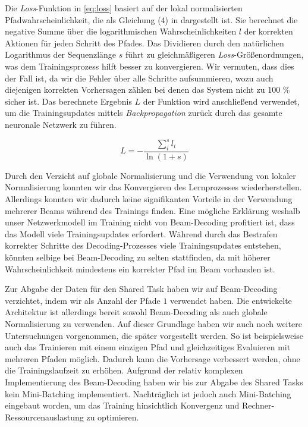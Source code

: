 \documentclass[11pt,a4paper]{article}
\begin{document}
Die \textit{Loss}-Funktion in \autoref{eq:loss} basiert auf der lokal normalisierten Pfadwahrscheinlichkeit, die als Gleichung (4) in \citet{globalnorm:AndorAWSPGPC16} dargestellt ist.
Sie berechnet die negative Summe über die logarithmischen Wahrscheinlichkeiten $l$ der korrekten Aktionen für jeden Schritt des Pfades.
Das Dividieren durch den natürlichen Logarithmus der Sequenzlänge $s$ führt zu gleichmäßigeren \textit{Loss}-Größenordnungen, was dem Trainingsprozess hilft besser zu konvergieren.
Wir vermuten, dass dies der Fall ist, da wir die Fehler über alle Schritte aufsummieren, wozu auch diejenigen korrekten Vorhersagen zählen bei denen das System nicht zu 100 \% sicher ist.
Das berechnete Ergebnis $L$ der Funktion wird anschließend verwendet, um die Trainingsupdates mittels \textit{Backpropagation} zurück durch das gesamte neuronale Netzwerk zu führen.

\begin{equation}
\label{eq:loss}
L = - \frac{\sum_i^s l_i}{\ln{(1+s)}}
\end{equation}

Durch den Verzicht auf globale Normalisierung und die Verwendung von lokaler Normalisierung konnten wir das Konvergieren des Lernprozesses wiederherstellen. Allerdings konnten wir dadurch keine signifikanten Vorteile in der Verwendung mehrerer Beams während des Trainings finden.
Eine mögliche Erklärung weshalb unser Netzwerkmodell im Training nicht von Beam-Decoding profitiert ist, dass das Modell viele Trainingsupdates erfordert.
Während durch das Bestrafen korrekter Schritte des Decoding-Prozesses viele Trainingsupdates entstehen, könnten selbige bei Beam-Decoding zu selten stattfinden, da mit höherer Wahrscheinlichkeit mindestens ein korrekter Pfad im Beam vorhanden ist.

Zur Abgabe der Daten für den Shared Task haben wir auf Beam-Decoding verzichtet, indem wir als Anzahl der Pfade $1$ verwendet haben.
Die entwickelte Architektur ist allerdings bereit sowohl Beam-Decoding als auch globale Normalisierung zu verwenden.
Auf dieser Grundlage haben wir auch noch weitere Untersuchungen vorgenommen, die später vorgestellt werden.
So ist beispielsweise auch das Trainieren mit einem einzigen Pfad und gleichzeitiges Evaluieren mit mehreren Pfaden möglich. Dadurch kann die Vorhersage verbessert werden, ohne die Trainingslaufzeit zu erhöhen.
Aufgrund der relativ komplexen Implementierung des Beam-Decoding haben wir bis zur Abgabe des Shared Tasks kein Mini-Batching implementiert. Nachträglich ist jedoch auch Mini-Batching eingebaut worden, um das Training hinsichtlich Konvergenz und Rechner-Ressourcenauslastung zu optimieren.
\end{document}
